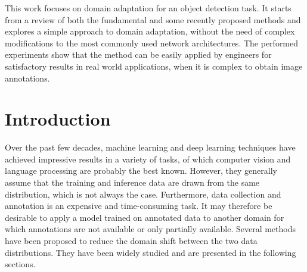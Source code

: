 \documentclass[%
    corpo=12pt,
    twoside,
    stile=classica,   
    tipotesi=magistrale,
    evenboxes,
    english,
	numerazioneromana,
]{toptesi}
\begin{document}
This work focuses on domain adaptation for an object detection task. It starts from a review of both the fundamental and some recently proposed methods and explores a simple approach to domain adaptation, without the need of complex modifications to the most commonly used network architectures. The performed experiments show that the method can be easily applied by engineers for satisfactory results in real world applications, when it is complex to obtain image annotations.

\paginavuota %

\indici

\mainmatter
\english

\chapter*{Introduction}
Over the past few decades, machine learning and deep learning techniques have achieved impressive results in a variety of tasks, of which computer vision and language processing are probably the best known. However, they generally assume that the training and inference data are drawn from the same distribution, which is not always the case. Furthermore, data collection and annotation is an expensive and time-consuming task. It may therefore be desirable to apply a model trained on annotated data to another domain for which annotations are not available or only partially available. Several methods have been proposed to reduce the domain shift between the two data distributions. They have been widely studied and are presented in the following sections.
\end{document}
